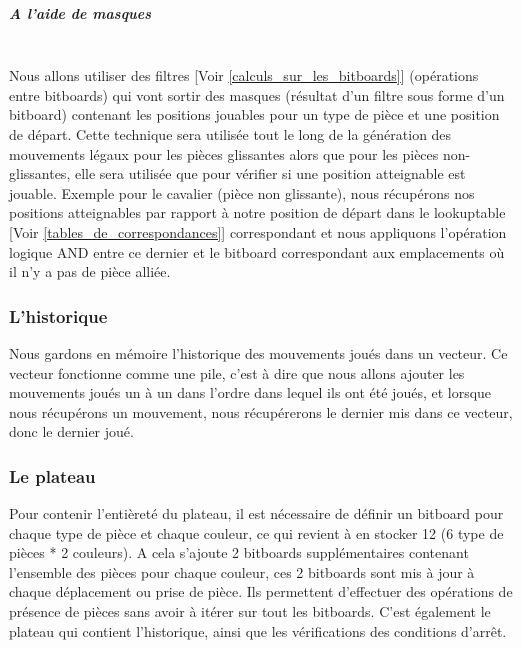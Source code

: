 \huge\documentclass{article}
\begin{document}
\subparagraph{A l'aide de masques}
~~\\
\newline
Nous allons utiliser des filtres [Voir \ref{calculs_sur_les_bitboards}] (opérations entre bitboards) qui vont sortir des masques (résultat d'un filtre sous forme d'un bitboard)
contenant les positions jouables pour un type de pièce et une position de départ.\newline
Cette technique sera utilisée tout le long de la génération des mouvements légaux pour les pièces glissantes alors que pour les pièces non-glissantes, elle sera utilisée que pour vérifier si une position atteignable est jouable.\newline
Exemple pour le cavalier (pièce non glissante), nous récupérons nos positions atteignables par rapport à notre position de départ dans le lookuptable [Voir \ref{tables_de_correspondances}] correspondant et nous appliquons l'opération logique AND entre ce dernier et le bitboard correspondant aux emplacements où il n'y a pas de pièce alliée.

\subsubsection{L'historique} \label{L'historique}
Nous gardons en mémoire l'historique des mouvements joués dans un vecteur.\newline
Ce vecteur fonctionne comme une pile, c'est à dire que nous allons ajouter les mouvements joués un à un dans l'ordre dans lequel ils ont été joués, et lorsque nous récupérons un mouvement, nous récupérerons le dernier mis dans ce vecteur, donc le dernier joué.

\subsubsection{Le plateau} \label{implementation_plateau}
Pour contenir l'entièreté du plateau, il est nécessaire de définir un bitboard pour chaque type de pièce et chaque couleur, ce qui revient à en stocker 12 (6 type de pièces * 2 couleurs).
A cela s'ajoute 2 bitboards supplémentaires contenant l'ensemble des pièces pour chaque couleur, ces 2 bitboards sont mis à jour à chaque déplacement ou prise de pièce.
Ils permettent d'effectuer des opérations de présence de pièces sans avoir à itérer sur tout les bitboards. \newline
C'est également le plateau qui contient l'historique, ainsi que les vérifications des conditions d'arrêt.
\end{document}
